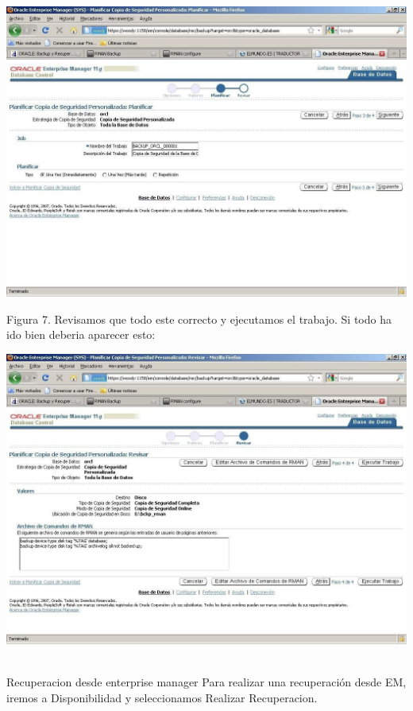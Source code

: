 \begin{enumerate}[1.]
\begin{center}
	\includegraphics[width=15cm]{./Imagenes/eje3}
	\end{center}
	Figura 7. Revisamos que todo este correcto y ejecutamos el trabajo. Si todo ha ido bien deberia aparecer esto:
	\begin{center}
	\includegraphics[width=15cm]{./Imagenes/eje4}
	\end{center}
	\\Recuperacion desde enterprise manager
	Para realizar una recuperación desde EM, iremos a Disponibilidad y seleccionamos
Realizar Recuperacion.
	\begin{center}

\end{center}
\end{enumerate}
